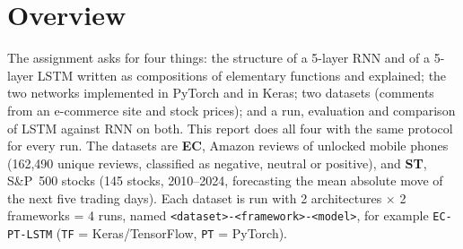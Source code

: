 \documentclass[11pt, a4paper]{article}
\newcommand{\run}[1]{\texttt{#1}}
\begin{document}
\section{Overview}

The assignment asks for four things: the structure of a 5-layer RNN and of a 5-layer LSTM written as compositions of elementary functions and explained; the two networks
implemented in PyTorch and in Keras; two datasets (comments from an e-commerce site and stock prices); and a run, evaluation and comparison of LSTM against RNN on both.
This report does all four with the same protocol for every run. The datasets are \textbf{EC}, Amazon reviews of unlocked mobile phones (162{,}490 unique reviews, classified as negative, neutral or positive),
and \textbf{ST}, S\&P~500 stocks (145 stocks, 2010--2024, forecasting the mean absolute move of the next five trading days). Each dataset is run with
2 architectures $\times$ 2 frameworks = 4 runs, named \run{<dataset>-<framework>-<model>}, for example \run{EC-PT-LSTM} (\run{TF} = Keras/TensorFlow, \run{PT} = PyTorch).

\begin{table}[H]
\centering
\caption{All eight runs on the test sets. EC: 16{,}249 reviews; ST: 108{,}315 windows (2022--2024). s/epoch = median time per epoch on a CPU.}
\label{tab:summary}
\small
\resizebox{\textwidth}{!}{}
\end{table}
\end{document}
